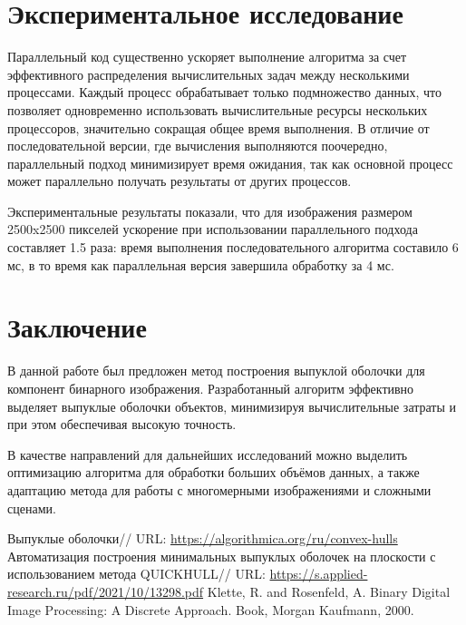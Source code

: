 \documentclass{report}
\begin{document}
\newpage
\section*{Экспериментальное исследование}

Параллельный код существенно ускоряет выполнение алгоритма за счет эффективного распределения вычислительных задач между несколькими процессами. Каждый процесс обрабатывает только подмножество данных, что позволяет одновременно использовать вычислительные ресурсы нескольких процессоров, значительно сокращая общее время выполнения. В отличие от последовательной версии, где вычисления выполняются поочередно, параллельный подход минимизирует время ожидания, так как основной процесс может параллельно получать результаты от других процессов.

Экспериментальные результаты показали, что для изображения размером 2500x2500 пикселей ускорение при использовании параллельного подхода составляет 1.5 раза: время выполнения последовательного алгоритма составило 6 мс, в то время как параллельная версия завершила обработку за 4 мс.

\newpage

\section*{Заключение}

В данной работе был предложен метод построения выпуклой оболочки для компонент бинарного изображения. Разработанный алгоритм эффективно выделяет выпуклые оболочки объектов, минимизируя вычислительные затраты и при этом обеспечивая высокую точность.

В качестве направлений для дальнейших исследований можно выделить оптимизацию алгоритма для обработки больших объёмов данных, а также адаптацию метода для работы с многомерными изображениями и сложными сценами.

\newpage

\begin{thebibliography}{1}
   Выпуклые оболочки// URL: \url{https://algorithmica.org/ru/convex-hulls}
   Автоматизация построения минимальных выпуклых оболочек на плоскости с использованием метода QUICKHULL// URL: \url{https://s.applied-research.ru/pdf/2021/10/13298.pdf}
   Klette, R. and Rosenfeld, A. Binary Digital Image Processing: A Discrete Approach. Book, Morgan Kaufmann, 2000.
  \end{thebibliography}
\newpage
\end{document}
